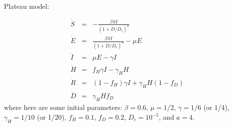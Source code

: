 \documentclass[12pt]{article}
\begin{document}
Plateau model:

\begin{eqnarray}
\dot{S} &=& -\frac{\beta SI}{\left(1+\dot{D}/D_c\right)^{a}}\\
\dot{E} &=& \frac{\beta SI}{\left(1+\dot{D}/D_c\right)^{a}}-\mu E\\
\dot{I} &=& \mu E-\gamma I \\
\dot{H} &=& f_H\gamma I-\gamma_H H \\
\dot{R} &=& (1-f_H)\gamma I+\gamma_HH(1-f_D) \\
\dot{D} &=& \gamma_H H f_D
\end{eqnarray}
where here are some initial parameters:
$\beta=0.6$, $\mu=1/2$, $\gamma=1/6$ (or 1/4), $\gamma_H=1/10$
(or 1/20), $f_H=0.1$, $f_D=0.2$, $D_c=10^{-5}$, and $a=4$.
\end{document}
